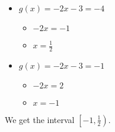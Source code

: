 \documentclass{ximera}
\begin{document}
\begin{itemize}
\item $g(x) = -2x-3 = -4$
\begin{itemize}
\item $-2x = -1$
\item $x = \frac{1}{2}$
\end{itemize}
\end{itemize}

\begin{itemize}
\item $g(x) = -2x-3 = -1$
\begin{itemize}
\item $-2x = 2$
\item $x = -1$
\end{itemize}
\end{itemize}


We get the interval $\left[ -1, \frac{1}{2} \right)$.
\end{document}
